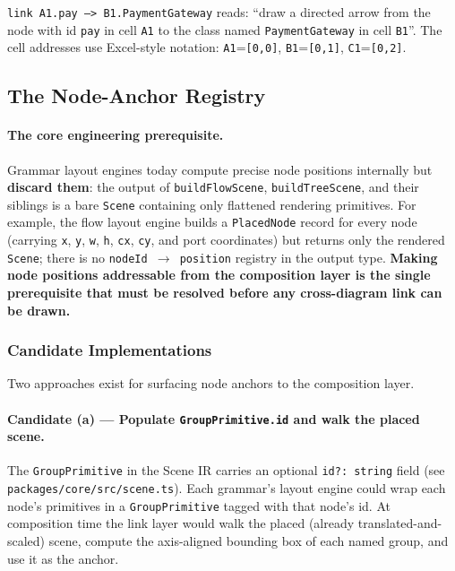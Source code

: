 \texttt{link A1.pay --> B1.PaymentGateway} reads: ``draw a directed arrow
from the node with id \texttt{pay} in cell \texttt{A1} to the class named
\texttt{PaymentGateway} in cell \texttt{B1}''.  The cell addresses use
Excel-style notation: \texttt{A1}=\texttt{[0,0]}, \texttt{B1}=\texttt{[0,1]},
\texttt{C1}=\texttt{[0,2]}.

\subsection{The Node-Anchor Registry}
\label{sec:cdl-anchor-registry}

\paragraph{The core engineering prerequisite.}

Grammar layout engines today compute precise node positions internally but
\textbf{discard them}: the output of \texttt{buildFlowScene}, \texttt{buildTreeScene},
and their siblings is a bare \texttt{Scene} containing only flattened
rendering primitives.  For example, the flow layout engine builds a
\texttt{PlacedNode} record for every node (carrying \texttt{x}, \texttt{y},
\texttt{w}, \texttt{h}, \texttt{cx}, \texttt{cy}, and port coordinates) but
returns only the rendered \texttt{Scene}; there is no \texttt{nodeId
$\to$ position} registry in the output type.  \textbf{Making node positions
addressable from the composition layer is the single prerequisite that must be
resolved before any cross-diagram link can be drawn.}

\subsubsection{Candidate Implementations}

Two approaches exist for surfacing node anchors to the composition layer.

\paragraph{Candidate (a) — Populate \texttt{GroupPrimitive.id} and walk the
placed scene.}

The \texttt{GroupPrimitive} in the Scene IR carries an optional \texttt{id?:\
string} field (see \texttt{packages/core/src/scene.ts}).  Each grammar's
layout engine could wrap each node's primitives in a \texttt{GroupPrimitive}
tagged with that node's id.  At composition time the link layer would walk the
placed (already translated-and-scaled) scene, compute the axis-aligned
bounding box of each named group, and use it as the anchor.

